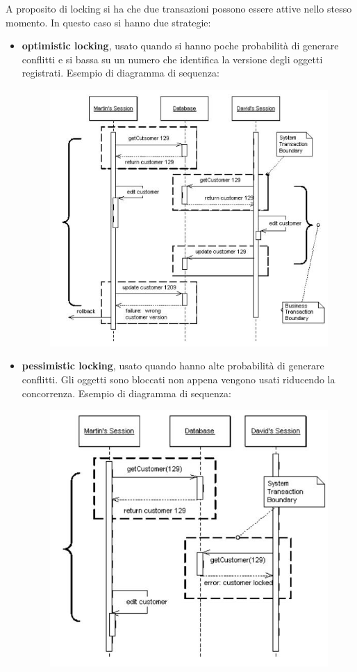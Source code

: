 \documentclass[a4paper,12pt, oneside]{book}
\begin{document}
A proposito di locking si ha che due transazioni possono essere attive nello
stesso momento. In questo caso si hanno due strategie:
\begin{itemize}
  \item \textbf{optimistic locking}, usato quando si hanno poche probabilità di
  generare conflitti e si bassa su un numero che identifica la versione degli
  oggetti registrati. Esempio di diagramma di sequenza:
  \begin{figure}[H]
    \centering
    \includegraphics[scale = 0.4]{img/ol.jpg}
  \end{figure}
  \item \textbf{pessimistic locking}, usato quando hanno alte probabilità di
  generare conflitti. Gli oggetti sono bloccati non appena vengono usati
  riducendo la concorrenza. Esempio di diagramma di sequenza:
  \begin{figure}[H]
    \centering
    \includegraphics[scale = 0.4]{img/pl.jpg}
  \end{figure}
\end{itemize}
\end{document}
